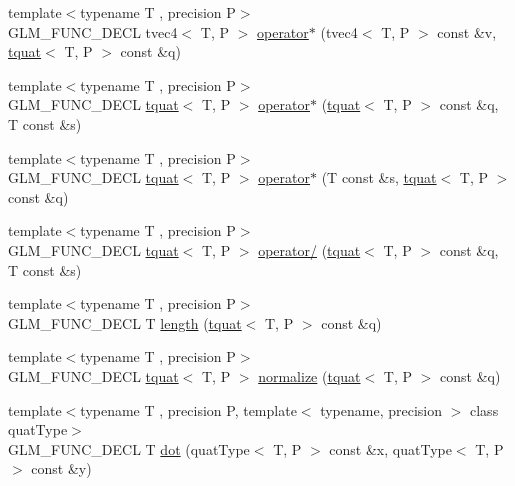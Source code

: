\begin{DoxyCompactItemize}
\item 
{\footnotesize template$<$typename T , precision P$>$ }\\G\+L\+M\+\_\+\+F\+U\+N\+C\+\_\+\+D\+E\+C\+L tvec4$<$ T, P $>$ \hyperlink{group__gtc__quaternion_ga9f4715d30e26cde878f16fef75b8e049}{operator$\ast$} (tvec4$<$ T, P $>$ const \&v, \hyperlink{structglm_1_1tquat}{tquat}$<$ T, P $>$ const \&q)
\item 
{\footnotesize template$<$typename T , precision P$>$ }\\G\+L\+M\+\_\+\+F\+U\+N\+C\+\_\+\+D\+E\+C\+L \hyperlink{structglm_1_1tquat}{tquat}$<$ T, P $>$ \hyperlink{group__gtc__quaternion_ga64f3ff448c382fd6642eafddd6ff65ea}{operator$\ast$} (\hyperlink{structglm_1_1tquat}{tquat}$<$ T, P $>$ const \&q, T const \&s)
\item 
{\footnotesize template$<$typename T , precision P$>$ }\\G\+L\+M\+\_\+\+F\+U\+N\+C\+\_\+\+D\+E\+C\+L \hyperlink{structglm_1_1tquat}{tquat}$<$ T, P $>$ \hyperlink{group__gtc__quaternion_ga8b18b7e92f80b6b26550a1035bca33ba}{operator$\ast$} (T const \&s, \hyperlink{structglm_1_1tquat}{tquat}$<$ T, P $>$ const \&q)
\item 
{\footnotesize template$<$typename T , precision P$>$ }\\G\+L\+M\+\_\+\+F\+U\+N\+C\+\_\+\+D\+E\+C\+L \hyperlink{structglm_1_1tquat}{tquat}$<$ T, P $>$ \hyperlink{group__gtc__quaternion_gab52fd3ac627908aa2aa1df96ddcdd113}{operator/} (\hyperlink{structglm_1_1tquat}{tquat}$<$ T, P $>$ const \&q, T const \&s)
\item 
{\footnotesize template$<$typename T , precision P$>$ }\\G\+L\+M\+\_\+\+F\+U\+N\+C\+\_\+\+D\+E\+C\+L T \hyperlink{group__gtc__quaternion_gac682181783027544c8d251b4d3a60cf8}{length} (\hyperlink{structglm_1_1tquat}{tquat}$<$ T, P $>$ const \&q)
\item 
{\footnotesize template$<$typename T , precision P$>$ }\\G\+L\+M\+\_\+\+F\+U\+N\+C\+\_\+\+D\+E\+C\+L \hyperlink{structglm_1_1tquat}{tquat}$<$ T, P $>$ \hyperlink{group__gtc__quaternion_ga35b6bcb22ac6d1e4a85440f5b69bdf86}{normalize} (\hyperlink{structglm_1_1tquat}{tquat}$<$ T, P $>$ const \&q)
\item 
{\footnotesize template$<$typename T , precision P, template$<$ typename, precision $>$ class quat\+Type$>$ }\\G\+L\+M\+\_\+\+F\+U\+N\+C\+\_\+\+D\+E\+C\+L T \hyperlink{group__gtc__quaternion_gac54dfc83de465a2d03e90d342242ab3d}{dot} (quat\+Type$<$ T, P $>$ const \&x, quat\+Type$<$ T, P $>$ const \&y)

\end{DoxyCompactItemize}
